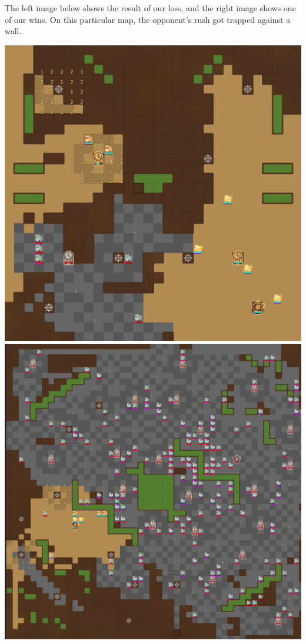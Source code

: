 The left image below shows the result of our loss, and the right image shows one of our wins. On this particular map, the opponent's rush got trapped against a wall.
\begin{center}
  \includegraphics[scale=0.1]{images/sprint1_loss.png}
  \includegraphics[scale=0.1]{images/sprint1_win.png}
\end{center}
